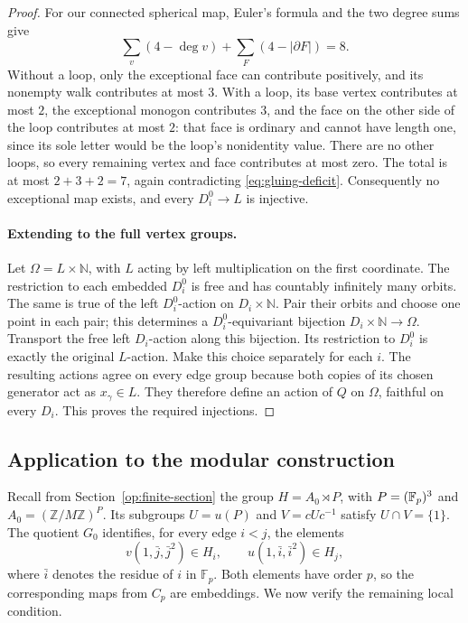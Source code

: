 \begin{proof}
For our connected spherical map, Euler's formula and the two degree
sums give
\begin{equation}\label{eq:gluing-deficit}
 \sum_{v}(4-\deg v)+\sum_{F}(4-|\partial F|)=8.
\end{equation}
Without a loop, only the exceptional face can contribute positively,
and its nonempty walk contributes at most $3$.  With a loop, its base
vertex contributes at most $2$, the exceptional monogon contributes
$3$, and the face on the other side of the loop contributes at most
$2$: that face is ordinary and cannot have length one, since its sole
letter would be the loop's nonidentity value.  There are no other
loops, so every remaining vertex and face contributes at most zero.
The total is at most $2+3+2=7$, again contradicting
\eqref{eq:gluing-deficit}.  Consequently no exceptional map exists,
and every $D_i^0\to L$ is injective.

\paragraph{Extending to the full vertex groups.}
Let $\Omega=L\times\mathbb N$, with $L$ acting by left multiplication
on the first coordinate.  The restriction to each embedded $D_i^0$
is free and has countably infinitely many orbits.  The same is true
of the left $D_i^0$-action on $D_i\times\mathbb N$.  Pair their orbits
and choose one point in each pair; this determines a $D_i^0$-equivariant
bijection $D_i\times\mathbb N\to\Omega$.  Transport the free left
$D_i$-action along this bijection.  Its restriction to $D_i^0$ is
exactly the original $L$-action.  Make this choice separately for each
$i$.  The resulting actions agree on every edge group because both
copies of its chosen generator act as $x_\gamma\in L$.  They therefore
define an action of $Q$ on $\Omega$, faithful on every $D_i$.  This
proves the required injections.
\end{proof}

\subsection{Application to the modular construction}

Recall from Section~\ref{op:finite-section} the group
$H=A_0\rtimes P$, with $P=(\mathbb F_p)^3$ and
$A_0=(\mathbb Z/M\mathbb Z)^P$. Its subgroups
$U=u(P)$ and $V=cUc^{-1}$ satisfy $U\cap V=\{1\}$.
The quotient $G_0$ identifies, for every edge $i<j$, the elements
\begin{equation}\label{eq:gluing-embeddings}
 v(1,\bar j,\bar j^{2})\in H_i,
 \qquad u(1,\bar i,\bar i^{2})\in H_j,
\end{equation}
where $\bar i$ denotes the residue of $i$ in $\mathbb F_p$.
Both elements have order $p$, so the corresponding maps from $C_p$
are embeddings. We now verify the remaining local condition.

